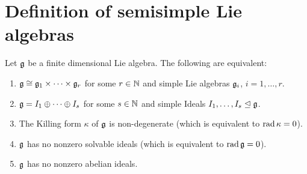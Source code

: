 \section{Definition of semisimple Lie algebras}


\begin{thrm}\label{thrm: characterisations of semisimple Lie algebras}
 Let $\mathfrak{g}$ be a finite dimensional Lie algebra. The following are equivalent:
 \begin{enumerate}[leftmargin=*]
  \item\label{enum: definition semisimple Lie algebra product of simple Lie algebras}
   $\mathfrak{g} \cong \mathfrak{g}_1 \times \dotsb \times \mathfrak{g}_r$ for some $r \in \mathbb{N}$ and simple Lie algebras $\mathfrak{g}_i$, $i = 1, \dotsc, r$.
  \item\label{enum: definition semisimple Lie algebra sum of simple ideals}
   $\mathfrak{g} = I_1 \oplus \dotsb \oplus I_s$ for some $s \in \mathbb{N}$ and simple Ideals $I_1, \dotsc, I_s \trianglelefteq \mathfrak{g}$.
  \item\label{enum: definition semisimple Lie algebra killing form nondegenerate}
   The Killing form $\kappa$ of $\mathfrak{g}$ is non-degenerate (which is equivalent to $\operatorname{rad} \kappa = 0$).
  \item\label{enum: definition semisimple Lie algebra radical is zero}
   $\mathfrak{g}$ has no nonzero solvable ideals (which is equivalent to $\operatorname{rad} \mathfrak{g} = 0$).
  \item\label{enum: definition semisimple Lie algebra no nonzero abelian ideals}
   $\mathfrak{g}$ has no nonzero abelian ideals.
 \end{enumerate}
\end{thrm}
